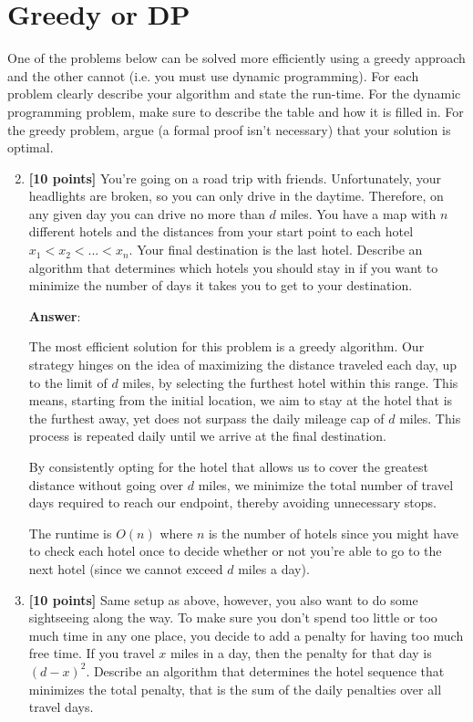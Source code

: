 \documentclass[11pt]{article}
\begin{document}
\section*{Greedy or DP}

One of the problems below can be solved more efficiently using a greedy approach and the other cannot (i.e. you must use dynamic programming).  For each problem clearly describe your algorithm and state the run-time.  For the dynamic programming problem, make sure to describe the table and how it is filled in.  For the greedy problem, argue (a formal proof isn't necessary) that your solution is optimal.

\begin{enumerate}

\setcounter{enumi}{1}

\item \textbf{[10 points]} You're going on a road trip with friends.  Unfortunately, your headlights are broken, so you can only drive in the daytime.  Therefore, on any given day you can drive no more than $d$ miles.  You have a map with $n$ different hotels and the distances from your start point to each hotel $x_1 < x_2 < ... < x_n$.  Your final destination is the last hotel.  Describe an algorithm that determines which hotels you should stay in if you want to minimize the number of days it takes you to get to your destination.

\textbf{Answer}:

The most efficient solution for this problem is a greedy algorithm. Our strategy hinges on the idea of maximizing the distance traveled each day, up to the limit of $d$ miles, by selecting the furthest hotel within this range. This means, starting from the initial location, we aim to stay at the hotel that is the furthest away, yet does not surpass the daily mileage cap of $d$ miles. This process is repeated daily until we arrive at the final destination.

By consistently opting for the hotel that allows us to cover the greatest distance without going over $d$ miles, we minimize the total number of travel days required to reach our endpoint, thereby avoiding unnecessary stops.

The runtime is $O(n)$ where $n$ is the number of hotels since you might have to check each hotel once to decide whether or not you're able to go to the next hotel (since we cannot exceed $d$ miles a day).

\item \textbf{[10 points]} Same setup as above, however, you also want to do some sightseeing along the way.  To make sure you don't spend too little or too much time in any one place, you decide to add a penalty for having too much free time.  If you travel $x$ miles in a day, then the penalty for that day is $(d - x)^2$.  Describe an algorithm that determines the hotel sequence that minimizes the total penalty, that is the sum of the daily penalties over all travel days.


\end{enumerate}
\end{document}
